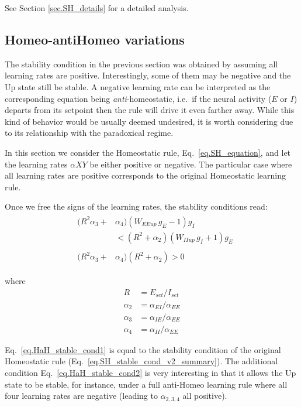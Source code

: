 \documentclass[twocolumn]{article}
\newcommand{\EE}{\mathit{EE}}
\newcommand{\EI}{\mathit{EI}}
\newcommand{\IE}{\mathit{IE}}
\newcommand{\II}{\mathit{II}}
\newcommand{\XY}{\mathit{XY}}
\newcommand{\set}{\mathit{set}}
\newcommand{\up}{\mathit{up}}
\begin{document}
See Section \ref{sec.SH_details} for a detailed analysis.



\subsection{Homeo-antiHomeo variations}

The stability condition in the previous section was obtained by assuming all learning rates are positive. Interestingly, some of them may be negative and the Up state still be stable. A negative learning rate can be interpreted as the corresponding equation being {\em anti}-homeostatic, i.e.\ if the neural activity ($E$ or $I$) departs from its setpoint then the rule will drive it even farther away. While this kind of behavior would be usually deemed undesired, it is worth considering due to its relationship with the paradoxical regime.

In this section we consider the Homeostatic rule, Eq.\ \ref{eq.SH_equation}, and let the learning rates $\alpha{\XY}$ be either positive or negative. The particular case where all learning rates are positive corresponds to the original Homeostatic learning rule.

Once we free the signs of the learning rates, the stability conditions read:
\begin{eqnarray}
& \begin{aligned}
(R^2 \alpha_3 + & \alpha_4)(W_{\EE\up} \, g_E  - 1)g_I \\
& < (R^2 + \alpha_2)(W_{\II\up} \, g_I + 1)g_E
\end{aligned}
\label{eq.HaH_stable_cond1} \\
& \begin{aligned}
(R^2 \alpha_3 + & \alpha_4)(R^2 + \alpha_2) > 0
\end{aligned}
\label{eq.HaH_stable_cond2}
\end{eqnarray}

\noindent where
\begin{displaymath}
\begin{aligned}
R & = E_{\set}/I_{\set} \\
\alpha_2 & = \alpha_{\EI}/\alpha_{\EE} \\
\alpha_3 & = \alpha_{\IE}/\alpha_{\EE} \\
\alpha_4 & = \alpha_{\II}/\alpha_{\EE}
\end{aligned}
\end{displaymath}

\noindent Eq.\ \ref{eq.HaH_stable_cond1} is equal to the stability condition of the original Homeostatic rule (Eq.\ \ref{eq.SH_stable_cond_v2_summary}). The additional condition Eq.\ \ref{eq.HaH_stable_cond2} is very interesting in that it allows the Up state to be stable, for instance, under a full anti-Homeo learning rule where all four learning rates are negative (leading to $\alpha_{2,3,4}$ all positive).
\end{document}
